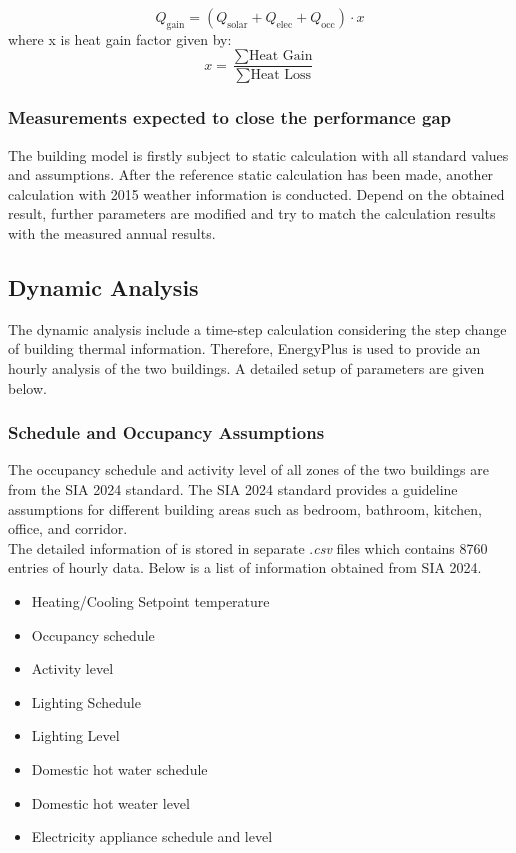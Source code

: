 \documentclass[11pt, a4paper]{article}
\theoremstyle{definition}
\begin{document}
			\[Q_{\text{gain}} = (Q_{\text{solar}} + Q_{\text{elec}} + Q_{\text{occ}}) \cdot x\]
			where x is heat gain factor given by:
			\[ x = \frac{\sum \text{Heat Gain}}{\sum \text{Heat Loss}}\]




	
		\subsubsection{Measurements expected to close the performance gap}
			The building model is firstly subject to static calculation with all standard values and assumptions. After the reference static calculation has been made, another calculation with 2015 weather information is conducted. Depend on the obtained result, further parameters are modified and try to match the calculation results with the measured annual results.

		
	\subsection{Dynamic Analysis}
		The dynamic analysis include a time-step calculation considering the step change of building thermal information. Therefore, EnergyPlus is used to provide an hourly analysis of the two buildings. A detailed setup of parameters are given below.
		

		
		\subsubsection{Schedule and Occupancy Assumptions}
			The occupancy schedule and activity level of all zones of the two buildings are from the SIA 2024 standard. The SIA 2024 standard provides a guideline assumptions for different building areas such as bedroom, bathroom, kitchen, office, and corridor.\\

			The detailed information of is stored in separate .\textit{csv} files which contains 8760 entries of hourly data. Below is a list of information obtained from SIA 2024.


				\begin{itemize}
					\item Heating/Cooling Setpoint temperature
					\item Occupancy schedule
					\item Activity level
					\item Lighting Schedule
					\item Lighting Level
					\item Domestic hot water schedule
					\item Domestic hot weater level
					\item Electricity appliance schedule and level
				\end{itemize}
				
\end{document}
